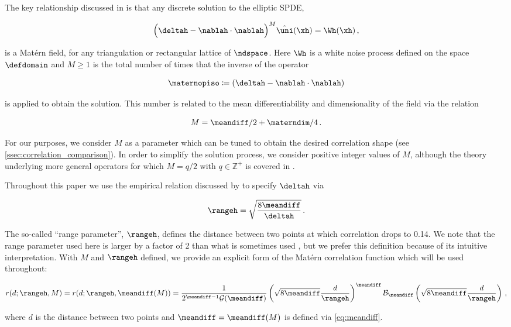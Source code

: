 \documentclass[alpha-refs]{wiley-article}
\begin{document}
The key relationship discussed in  is that any discrete solution to
the elliptic SPDE,
\begin{linenomath*}\begin{equation}
    \Big(\deltah - \nablah\cdot\nablah\Big)^{M}\hat{\uni}(\xh) =
    \Wh(\xh) \, ,
    \label{eq:spde_iso}
\end{equation}\end{linenomath*}
is a Mat\'ern field, for any triangulation or rectangular lattice of $\ndspace$.
Here
$\Wh$ is a white noise process defined on the space $\defdomain$ and
$M\ge 1$ is the total number of times that the inverse of the operator
\begin{linenomath*}\begin{equation*}
\maternopiso \coloneqq (\deltah - \nablah \cdot \nablah)
\end{equation*}\end{linenomath*}
is applied to obtain the solution.
This number is related to the mean differentiability and
dimensionality of the field via the relation
\begin{linenomath*}\begin{equation}
    M = \meandiff/2 + \materndim/4 \, .
    \label{eq:meandiff}
\end{equation}\end{linenomath*}
For our purposes, we consider $M$ as a parameter which can be tuned to obtain the
desired correlation shape (see \cref{ssec:correlation_comparison}).
In order to simplify the solution process, we consider positive integer values
of $M$, although the theory underlying more general operators
for which $M=q/2$ with $q\in\mathbb{Z}^+$ is covered in .

Throughout this paper we use the empirical relation discussed by
 to specify $\deltah$ via
\begin{linenomath*}\begin{equation}
    \rangeh = \sqrt{\dfrac{8\meandiff}{\deltah}} \, .
\end{equation}\end{linenomath*}
The so-called ``range parameter'', $\rangeh$, defines the distance between two
points at which correlation drops to 0.14.
We note that the range parameter used here is larger by a factor of 2 than what
is sometimes used \citep[e.g.,][]{rasmussen_gaussian_2006},
but we prefer this definition because of its intuitive interpretation.
With $M$ and $\rangeh$ defined, we provide an explicit form of the Mat\'ern
correlation function which will be used throughout:
\begin{linenomath*}\begin{equation}
    r(d; \rangeh, M) =
    r(d; \rangeh, \meandiff(M)) =
    \dfrac{1}{2^{\meandiff-1}
    \mathcal{G}(\meandiff)}
    \left(\sqrt{8\meandiff} \dfrac{d}{\rangeh}\right)^{\meandiff}
    \mathcal{B}_\meandiff
    \left(\sqrt{8\meandiff} \dfrac{d}{\rangeh}\right) \, ,
\end{equation}\end{linenomath*}
where $d$ is the distance between two points and $\meandiff = \meandiff(M)$ is defined via
\cref{eq:meandiff}.
\end{document}
